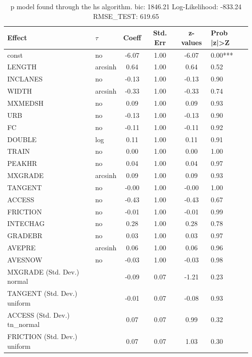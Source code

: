 \begin{table}
	\caption{p model found through the hs algorithm. bic: 1846.21 Log-Likelihood: -833.24 RMSE_TEST: 619.65}
	\begin{center}
		\begin{tabular}{|l|l|c|c|c|l|}
			\hline
			Effect & $\tau$ & Coeff & Std. Err & z-values & Prob |z|>Z \\
			\hline
			const & no & -6.07 & 1.00 & -6.07 & 0.00*** \\
			\hline
			LENGTH & arcsinh & 0.64 & 1.00 & 0.64 & 0.52 \\
			\hline
			INCLANES & no & -0.13 & 1.00 & -0.13 & 0.90 \\
			\hline
			WIDTH & arcsinh & -0.33 & 1.00 & -0.33 & 0.74 \\
			\hline
			MXMEDSH & no & 0.09 & 1.00 & 0.09 & 0.93 \\
			\hline
			URB & no & -0.13 & 1.00 & -0.13 & 0.90 \\
			\hline
			FC & no & -0.11 & 1.00 & -0.11 & 0.92 \\
			\hline
			DOUBLE & log & 0.11 & 1.00 & 0.11 & 0.91 \\
			\hline
			TRAIN & no & 0.00 & 1.00 & 0.00 & 1.00 \\
			\hline
			PEAKHR & no & 0.04 & 1.00 & 0.04 & 0.97 \\
			\hline
			MXGRADE & arcsinh & 0.09 & 1.00 & 0.09 & 0.93 \\
			\hline
			TANGENT & no & -0.00 & 1.00 & -0.00 & 1.00 \\
			\hline
			ACCESS & no & -0.43 & 1.00 & -0.43 & 0.67 \\
			\hline
			FRICTION & no & -0.01 & 1.00 & -0.01 & 0.99 \\
			\hline
			INTECHAG & no & 0.28 & 1.00 & 0.28 & 0.78 \\
			\hline
			GRADEBR & no & 0.03 & 1.00 & 0.03 & 0.97 \\
			\hline
			AVEPRE & arcsinh & 0.06 & 1.00 & 0.06 & 0.96 \\
			\hline
			AVESNOW & no & -0.03 & 1.00 & -0.03 & 0.98 \\
			\hline
			MXGRADE (Std. Dev.) normal &  & -0.09 & 0.07 & -1.21 & 0.23 \\
			\hline
			TANGENT (Std. Dev.) uniform &  & -0.01 & 0.07 & -0.08 & 0.93 \\
			\hline
			ACCESS (Std. Dev.) tn_normal &  & 0.07 & 0.07 & 0.99 & 0.32 \\
			\hline
			FRICTION (Std. Dev.) uniform &  & 0.07 & 0.07 & 1.03 & 0.30 \\

\end{tabular}
\end{center}
\end{table}
